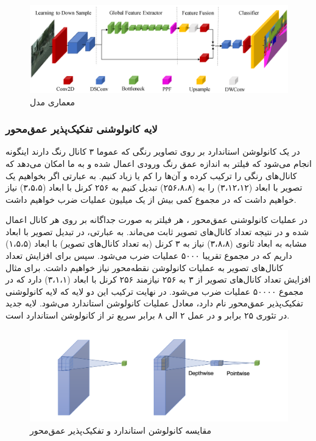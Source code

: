 \begin{figure}[ht]
	\centering
	\includegraphics[width=0.9\linewidth, height=0.2\textheight]{Images/Chapter3/FastSCNN.png}
	\caption{معماری مدل }
	\label{fig:fig10}
\end{figure}

\subsubsection{لایه‌ کانولوشنی تفکیک‌پذیر عمق‌محور}

در یک کانولوشن استاندارد بر روی تصاویر رنگی که عموما ۳ کانال رنگ دارند اینگونه انجام می‌شود که فیلتر به اندازه عمق رنگ ورودی اعمال شده و به ما امکان می‌دهد که کانال‌های رنگی را ترکیب کرده و آن‌ها را کم یا زیاد کنیم. به عبارتی اگر بخواهیم یک تصویر با ابعاد (۳،۱۲،۱۲) را به (۲۵۶،۸،۸) تبدیل کنیم به ۲۵۶ کرنل با ابعاد (۳،۵،۵) نیاز خواهیم داشت که در مجموع کمی بیش از یک میلیون عملیات ضرب خواهیم داشت.

در عملیات کانولوشنی عمق‌محور
، هر فیلتر به صورت جداگانه بر روی هر کانال اعمال شده و در نتیجه تعداد کانال‌های تصویر ثابت می‌ماند. به عبارتی، در تبدیل تصویر با ابعاد مشابه به ابعاد ثانوی (۳،۸،۸) نیاز به ۳ کرنل (به تعداد کانال‌های تصویر) با ابعاد (۱،۵،۵) داریم که در مجموع تقریبا ۵۰۰۰ عملیات ضرب می‌شود. سپس برای افزایش تعداد کانال‌های تصویر به عملیات کانولوشن نقطه‌محور
\cite{hua2018pointwise}
نیاز خواهیم داشت. برای مثال افزایش تعداد کانال‌های تصویر از ۳ به ۲۵۶ نیازمند ۲۵۶ کرنل با ابعاد (۳،۱،۱) دارد که در مجموع ۵۰۰۰۰ عملیات ضرب می‌شود. در نهایت ترکیب این دو لایه که لایه‌ کانولوشنی تفکیک‌پذیر عمق‌محور
\cite{chollet2017xception, nascimento2019dsconv}
نام دارد، معادل عملیات کانولوشن استاندارد می‌شود. لایه جدید در تئوری ۲۵ برابر و در عمل ۲ الی ۸ برابر سریع تر از کانولوشن استاندارد است.

\begin{figure}[ht]
	\centering
	\includegraphics[width=0.9\linewidth, height=0.2\textheight]{Images/Chapter3/DepthwiseSeparableConvolution.png}
	\caption{مقایسه کانولوشن استاندارد و تفکیک‌پذیر عمق‌محور}
	\label{fig:fig9}
\end{figure}

